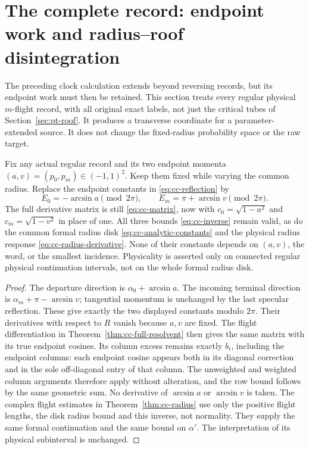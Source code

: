 \section{The complete record: endpoint work and radius--roof disintegration}
\label{sec:rc-complete}
The preceding clock calculation extends beyond reversing records, but
its endpoint work must then be retained.  This section treats every
regular physical $m$-flight record, with all original exact labels,
not just the critical tubes of Section~\ref{sec:pt-roof}.  It produces
a transverse coordinate for a parameter-extended source.  It does
not change the fixed-radius probability space or the raw target.

\begin{theorem}
\label{thm:rc-continuation}
Fix any actual regular record and its two endpoint momenta
$(a,v)=(p_0,p_m)\in(-1,1)^2$.  Keep them fixed while varying the
common radius.  Replace the endpoint constants in
\eqref{eq:cc-reflection} by
\[
 E_0=-\arcsin a\pmod{2\pi},\qquad
 E_m=\pi+\arcsin v\pmod{2\pi}.
\]
The full derivative matrix is still \eqref{eq:cc-matrix}, now with
$c_0=\sqrt{1-a^2}$ and $c_m=\sqrt{1-v^2}$ in place of one.
All three bounds \eqref{eq:cc-inverse} remain valid, as do the common
formal radius disk \eqref{eq:cc-analytic-constants} and the physical
radius response \eqref{eq:cc-radius-derivative}.  None of their
constants depends on $(a,v)$, the word, or the smallest incidence.
Physicality is asserted only on connected regular physical
continuation intervals, not on the whole formal radius disk.
\end{theorem}
\begin{proof}
The departure direction is $\alpha_0+\arcsin a$.  The incoming
terminal direction is $\alpha_m+\pi-\arcsin v$; tangential momentum
is unchanged by the last specular reflection.  These give exactly
the two displayed constants modulo $2\pi$.  Their derivatives with
respect to $R$ vanish because $a,v$ are fixed.
The flight differentiation in Theorem~\ref{thm:cc-full-resolvent}
then gives the same matrix with its true endpoint cosines.  Its
column excess remains exactly $b_i$, including the endpoint columns:
each endpoint cosine appears both in its diagonal correction and in
the sole off-diagonal entry of that column.  The unweighted and
weighted column arguments therefore apply without alteration, and
the row bound follows by the same geometric sum.  No derivative of
$\arcsin a$ or $\arcsin v$ is taken.  The complex flight estimates
in Theorem~\ref{thm:cc-radius} use only the positive flight lengths,
the disk radius bound and this inverse, not normality.  They supply
the same formal continuation and the same bound on $\alpha'$.
The interpretation of its physical subinterval is unchanged.
\end{proof}

